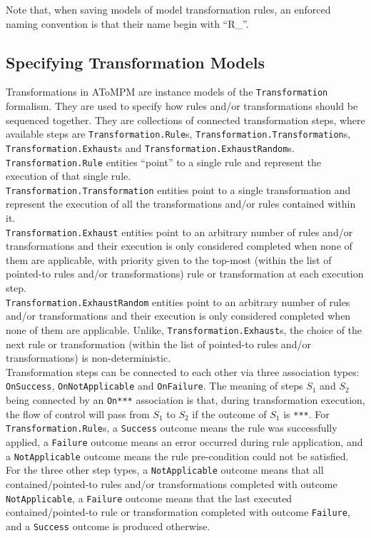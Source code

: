 \documentclass{article}
\numberwithin{equation}{section}
\numberwithin{figure}{section}
\begin{document}
Note that, when saving models of model transformation rules, an enforced naming convention is that their name begin with ``R\_''.



\subsection{Specifying Transformation Models}
\label{ssec:tmm}
Transformations in AToMPM are instance models of the \texttt{Transformation} formalism. They are used to specify how rules and/or transformations should be sequenced together. They are collections of connected transformation steps, where available steps are \texttt{Transformation.Rule}s, \texttt{Transformation.Transformation}s, \texttt{Transformation.Exhaust}s and \texttt{Transformation.ExhaustRandom}s.\\

\texttt{Transformation.Rule} entities ``point'' to a single rule and represent the execution of that single rule.\\

\texttt{Transformation.Transformation} entities point to a single transformation and represent the execution of all the transformations and/or rules contained within it.\\

\texttt{Transformation.Exhaust} entities point to an arbitrary number of rules and/or transformations and their execution is only considered completed when none of them are applicable, with priority given to the top-most (within the list of pointed-to rules and/or transformations) rule or transformation at each execution step.\\

\texttt{Transformation.ExhaustRandom} entities point to an arbitrary number of rules and/or transformations and their execution is only considered completed when none of them are applicable. Unlike, \texttt{Transformation.Exhaust}s, the choice of the next rule or transformation (within the list of pointed-to rules and/or transformations) is non-deterministic.\\

Transformation steps can be connected to each other via three association types: \texttt{OnSuccess}, \texttt{OnNotApplicable} and \texttt{OnFailure}. The meaning of steps $S_1$ and $S_2$ being connected by an \texttt{On***} association is that, during transformation execution, the flow of control will pass from $S_1$ to $S_2$ if the outcome of $S_1$ is \texttt{***}. For \texttt{Transformation.Rule}s, a \texttt{Success} outcome means the rule was successfully applied, a \texttt{Failure} outcome means an error occurred during rule application, and a \texttt{NotApplicable} outcome means the rule pre-condition could not be satisfied. For the three other step types, a \texttt{NotApplicable} outcome means that all contained/pointed-to rules and/or transformations completed with outcome \texttt{NotApplicable}, a \texttt{Failure} outcome means that the last executed contained/pointed-to rule or transformation completed with outcome \texttt{Failure}, and a \texttt{Success} outcome is produced otherwise.\\
\end{document}
